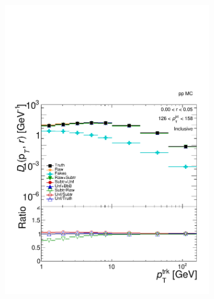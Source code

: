 \begin{figure}
\begin{subfigure}{0.5\textwidth}
\centering \includegraphics[page=5, width=1\textwidth]{figures/main/corrections/evol_pp_MC.pdf}
\caption{}
\end{subfigure}
\begin{subfigure}{0.5\textwidth}

\end{subfigure}
\end{figure}
